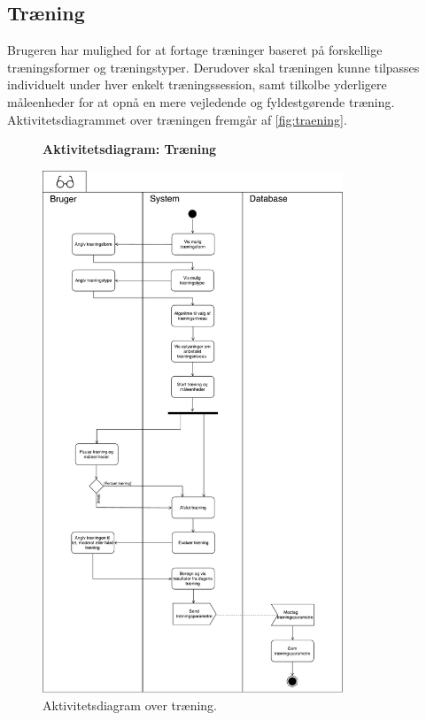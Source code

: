 \subsection*{Træning} \label{sec:traening}
Brugeren har mulighed for at fortage træninger baseret på forskellige træningsformer og træningstyper. Derudover skal træningen kunne tilpasses individuelt under hver enkelt træningssession, samt tilkolbe yderligere måleenheder for at opnå en mere vejledende og fyldestgørende træning.  
Aktivitetsdiagrammet over træningen fremgår af \autoref{fig:traening}. 

\begin{figure} [H]
\centering
\textbf{Aktivitetsdiagram: Træning}\par\medskip
\includegraphics[width=0.8\textwidth]{figures/aktivitetsdiagram/NYTraening}
\caption{Aktivitetsdiagram over træning.}
\label{fig:traening}
\end{figure}

